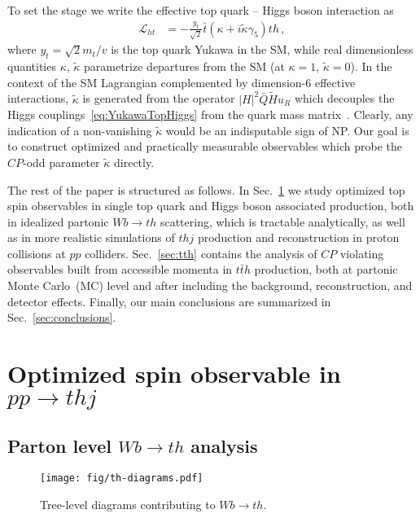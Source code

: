 \documentclass[11pt,a4paper]{article}
\newcommand{\lagr}{\mathcal{L}}
\begin{document}
To set the stage we write the effective top quark -- Higgs boson interaction as
\begin{equation}
\label{eq:YukawaTopHiggs}
\begin{split}   
\lagr_{ht} &= -\frac{y_t}{\sqrt{2}} \bar t(\kappa  + i \tilde{\kappa} \gamma_5) t h\,,
\end{split}
\end{equation} 
where $y_t = \sqrt{2} m_t/v$ is the top quark Yukawa in the SM, while
real dimensionless quantities $\kappa$, $\tilde \kappa$ parametrize
departures from the SM (at $\kappa =1$, $\tilde{\kappa} =0$). In the
context of the SM Lagrangian complemented by dimension-6 effective
interactions, $\tilde \kappa$ is generated from the operator
$|H|^2 \bar Q \tilde H u_R$ which decouples the Higgs couplings~\eqref{eq:YukawaTopHiggs} from
the quark mass matrix~\cite{AguilarSaavedra:2009mx}. Clearly, any
indication of a non-vanishing $\tilde{\kappa}$ would be an
indisputable sign of NP.  Our goal is to construct optimized and
practically measurable observables which probe the $CP$-odd parameter
$\tilde{\kappa}$ directly.

The rest of the paper is structured as follows. In Sec.~\ref{sec:thj} we study optimized top spin observables in single top quark and Higgs boson associated production, both in idealized partonic $Wb \to th$ scattering, which is tractable analytically, as well as in more realistic simulations of $thj$ production and reconstruction in proton collisions at $pp$ colliders. Sec.~\ref{sec:tth} contains the analysis of $CP$ violating observables built from accessible momenta in $t\bar t h$ production, both at partonic Monte Carlo~(MC) level and after including the background, reconstruction, and detector effects. Finally, our main conclusions are summarized in Sec.~\ref{sec:conclusions}.


%
\section{Optimized spin observable in $pp \to t h j$}\label{sec:thj}
%


\subsection{Parton level $Wb \to th$ analysis}
\begin{figure}
	\centering\texttt{[image: fig/th-diagrams.pdf]}
	\caption{Tree-level diagrams contributing to $W  b  \to t  h$.}
	\label{fig:diagramsWbth}
\end{figure}
\end{document}
